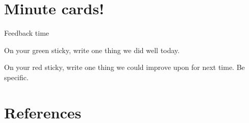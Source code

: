 \documentclass[aspectratio=1610, 11pt]{beamer} %
\begin{document}





\section{Minute cards!}
\begin{frame}{Feedback time}

On your green sticky, write one thing we did well today.

On your red sticky, write one thing we could improve upon for next time. Be specific. 

\end{frame}

\section{References}

\begin{multicols}{2}[]


\end{multicols}
\end{document}
